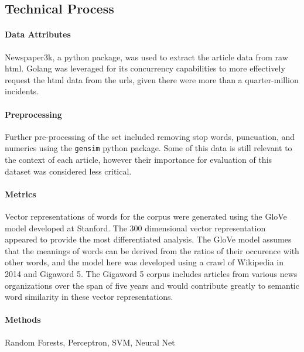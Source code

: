 \subsection{Technical Process}

\paragraph{Data Attributes}
Newspaper3k, a python package, was used to extract the article data from raw html.  Golang was leveraged for its
concurrency capabilities to more effectively request the html data from the urls, given there were more than a quarter-million
incidents.

\paragraph{Preprocessing}
\cite{latexcompanion}
Further pre-processing of the set included removing stop words, puncuation, and numerics using the \texttt{gensim} python package. Some of this data is still relevant to the context of each article, however their importance for evaluation of this dataset was considered less critical.

\paragraph{Metrics}
\cite{knuthwebsite}
Vector representations of words for the corpus were generated using the GloVe model developed at Stanford.  The 300
dimensional vector representation appeared to provide the most differentiated analysis. The GloVe model assumes that
the meanings of words can be derived from the ratios of their occurence with other words, and the model here was developed
using a crawl of Wikipedia in 2014 and Gigaword 5. The Gigaword 5 corpus includes articles from various news organizations
over the span of five years and would contribute greatly to semantic word similarity in these vector representations.

\paragraph{Methods}
Random Forests, Perceptron, SVM, Neural Net
